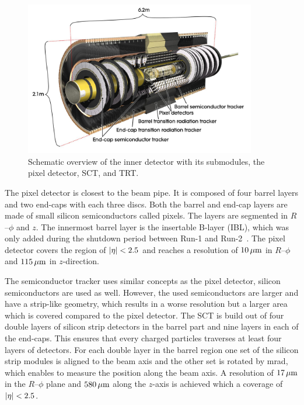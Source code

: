 \begin{figure}[htb]
    \centering
    \includegraphics[width=0.9\textwidth]{./figures/setup/inner_detector.jpg}
    \caption{Schematic overview of the inner detector with its submodules, the pixel detector, SCT, and TRT\@.~\cite{ImageID}}\label{fig:setup:id}
\end{figure}

The pixel detector is closest to the beam pipe.
It is composed of four barrel layers and two end-caps with each three discs.
Both the barrel and end-cap layers are made of small silicon semiconductors called pixels.
The layers are segmented in $R$\nobreakdash--$\phi$ and $z$.
The innermost barrel layer is the insertable B-layer (IBL), which was only added during the shutdown period
between Run-1 and Run-2~\cite{ATLAS-TDR-19}.
The pixel detector covers the region of $\left|\eta\right| < 2.5$ and reaches a resolution of $\unit[10]{\mu m}$ in
$R$\nobreakdash--$\phi$ and $\unit[115]{\mu m}$ in $z$-direction.

The semiconductor tracker uses similar concepts as the pixel detector, silicon semiconductors are used as well.
However, the used semiconductors are larger and have a strip-like geometry, which results in a worse resolution
but a larger area which is covered compared to the pixel detector.
The SCT is build out of four double layers of silicon strip detectors in the barrel part and nine layers in each of the
end-caps.
This ensures that every charged particles traverses at least four layers of detectors.
For each double layer in the barrel region one set of the silicon strip modules is aligned to the beam axis and the other set
is rotated by \unit[40]{mrad}, which enables to measure the position along the beam axis.
A resolution of $\unit[17]{\mu m}$ in the $R$\nobreakdash--$\phi$ plane and $\unit[580]{\mu m}$ along the
$z$-axis is achieved which a coverage of $\left|\eta\right| < 2.5$.

